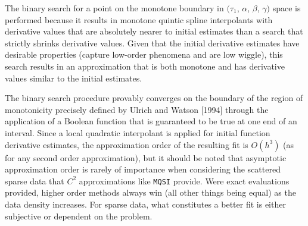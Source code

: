 The binary search for a point on the monotone boundary in $(\tau_1$,
$\alpha$, $\beta$, $\gamma)$ space is performed because it results in
monotone quintic spline interpolants with derivative values that are
absolutely nearer to initial estimates than a search that strictly
shrinks derivative values. Given that the initial derivative estimates
have desirable properties (capture low-order phenomena and are low
wiggle), this search results in an approximation that is both monotone
and has derivative values similar to the initial estimates.

\beginred
The binary search procedure provably converges on the boundary of the
region of monotonicity precisely defined by Ulrich and Watson [1994]
through the application of a Boolean function that is guaranteed to be
true at one end of an interval. Since a local quadratic interpolant is
applied for initial function derivative estimates, the approximation
order of the resulting fit is $O(h^3)$ (as for any second order
approximation), but it should be noted that asymptotic approximation
order is rarely of importance when considering the scattered sparse
data that $C^2$ approximations like {\tt MQSI} provide. Were exact
evaluations provided, higher order methods always win \textRed (all
other things being equal) as the data density increases. For sparse
data, what constitutes a better fit is either subjective or dependent
on the problem.
\endred
